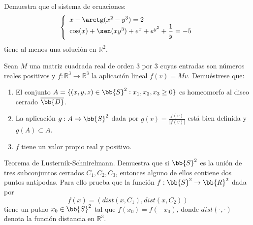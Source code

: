 \begin{ejercicio}
    Demuestra que el sistema de ecuaciones:
    \begin{equation*}
        \left\{\begin{array}{l}
            x-\arctg(x^2-y^3) = 2 \\
            \cos(x) + \sen(xy^3) + e^x + e^{y^2} + \dfrac{1}{y} = -5
        \end{array}\right.
    \end{equation*}
    tiene al menos una solución en $\mathbb{R}^2$.
\end{ejercicio}

\begin{ejercicio}
    Sean $M$ una matriz cuadrada real de orden 3 por 3 cuyas entradas son números reales positivos
    y $f:\mathbb{R}^3\to \mathbb{R}^3$ la aplicación lineal $f(v)=Mv$. Demuéstrese que:
    \begin{enumerate}[label=\alph*)]
        \item El conjunto $A=\{(x,y,z)\in \bb{S}^2:x_1,x_2,x_3\geq 0\}$ es homeomorfo al disco cerrado $\overline{\bb{D}}$.
        \item La aplicación $g:A\to \bb{S}^2$ dada por $g(v) = \frac{f(v)}{|f(v)|}$ está bien definida y $g(A)\subset A$.
        \item $f$ tiene un valor propio real y positivo.
    \end{enumerate}
\end{ejercicio}

\begin{ejercicio}
    Teorema de Lusternik-Schnirelmann. Demuestra que si $\bb{S}^2$ es la unión de tres subconjuntos cerrados $C_1,C_2,C_3$, entonces alguno de ellos contiene dos puntos antípodas. Para ello prueba que la función $f:\bb{S}^2\to \bb{R}^2$ dada por
    \begin{equation*}
        f(x) = (dist(x,C_1), dist(x,C_2))
    \end{equation*}
    tiene un putno $x_0\in \bb{S}^2$ tal que $f(x_0) = f(-x_0)$, donde $dist(\cdot ,\cdot )$ denota la función distancia en $\mathbb{R}^3$.
\end{ejercicio}

